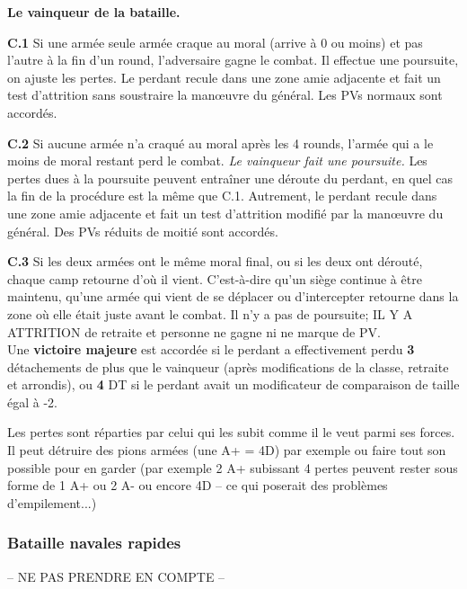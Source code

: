 \textbf{Le vainqueur de la bataille.}

{\bf C.1} Si une armée seule armée craque au moral (arrive à 0 ou moins) et pas l'autre à la fin
d'un round, l'adversaire gagne le combat. Il effectue une poursuite, on ajuste les
pertes. Le perdant recule dans une zone amie adjacente et fait un test d'attrition
sans soustraire la man{\oe}uvre du général. Les PVs normaux sont accordés.

{\bf C.2} Si aucune armée n'a craqué au moral après les 4 rounds, l'armée qui a le moins de moral restant perd
le combat. \textit{Le vainqueur fait une poursuite.} Les pertes dues à la poursuite
peuvent entraîner une déroute du perdant, en quel cas la fin de la procédure est la même
que C.1. Autrement, le perdant recule dans une zone amie adjacente et fait un test d'attrition
modifié par la man{\oe}uvre du général. Des PVs réduits de moitié sont accordés.

{\bf C.3} Si les deux armées ont le même moral final, ou si les deux ont dérouté,
chaque camp retourne d'où il vient. C'est-à-dire qu'un siège continue à être maintenu, qu'une
armée qui vient de se déplacer ou d'intercepter retourne dans la zone où elle était juste
avant le combat. Il n'y a pas de poursuite; IL Y A ATTRITION de retraite et personne ne gagne
ni ne marque de PV.\\

Une \textbf{victoire majeure} est accordée si le perdant a effectivement perdu
\textbf{3} détachements
de plus que le vainqueur (après modifications de la classe, retraite et arrondis),
ou \textbf{4} DT si le perdant avait un modificateur de comparaison de taille
égal à -2.

Les pertes sont réparties par celui qui les subit comme il le veut parmi ses forces.
Il peut détruire des pions armées (une A+ = 4D) par exemple ou faire tout son
possible pour en garder (par exemple 2 A+ subissant 4 pertes peuvent rester sous
forme de 1 A+ ou 2 A- ou encore 4D -- ce qui poserait des problèmes d'empilement...)

\subsubsection{Bataille navales rapides}
-- NE PAS PRENDRE EN COMPTE --

